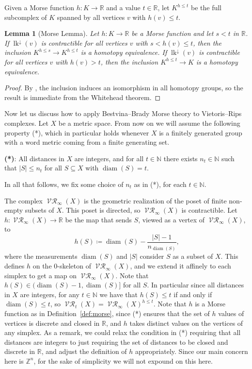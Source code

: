 \documentclass[a4paper,11pt]{amsart}
\newtheorem{lemma}[theorem]{Lemma}
\theoremstyle{definition}
\newcommand{\N}{\mathbb{N}}
\newcommand{\Z}{\mathbb{Z}}
\newcommand{\R}{\mathbb{R}}
\DeclareMathOperator{\diam}{diam}
\DeclareMathOperator{\Rips}{\mathcal{VR}}
\newcommand{\lk}{\operatorname{lk}}
\newcommand{\dlk}{\lk^\downarrow\!}
\numberwithin{equation}{section}
\begin{document}
Given a Morse function $h\colon K\to \R$ and a value $t\in\R$, let $K^{h\le t}$ be the full subcomplex of $K$ spanned by all vertices $v$ with $h(v)\le t$.

\begin{lemma}[Morse Lemma]\label{lem:morse}
Let $h\colon K\to\R$ be a Morse function and let $s<t$ in $\R$. If $\dlk(v)$ is contractible for all vertices $v$ with $s<h(v)\le t$, then the inclusion $K^{h\le s}\to K^{h\le t}$ is a homotopy equivalence. If $\dlk(v)$ is contractible for all vertices $v$ with $h(v)>t$, then the inclusion $K^{h\le t}\to K$ is a homotopy equivalence.
\end{lemma}

\begin{proof}
By \cite[Corollary~1.11]{zaremsky22}, the inclusion induces an isomorphism in all homotopy groups, so the result is immediate from the Whitehead theorem.
\end{proof}

\medskip

Now let us discuss how to apply Bestvina--Brady Morse theory to Vietoris--Rips complexes. Let $X$ be a metric space. From now on we will assume the following property (*), which in particular holds whenever $X$ is a finitely generated group with a word metric coming from a finite generating set.

\medskip

\noindent\textbf{(*)}: All distances in $X$ are integers, and for all $t\in\N$ there exists $n_t\in\N$ such that $|S|\le n_t$ for all $S\subseteq X$ with $\diam(S)=t$.

\medskip

In all that follows, we fix some choice of $n_t$ as in (*), for each $t\in\N$.

The complex $\Rips_\infty(X)$ is the geometric realization of the poset of finite non-empty subsets of $X$. This poset is directed, so $\Rips_\infty(X)$ is contractible. Let $h\colon \Rips_\infty(X) \to \R$ be the map that sends $S$, viewed as a vertex of $\Rips_\infty(X)$, to
\[
h(S)\coloneqq \diam(S) - \frac{|S|-1}{n_{\diam(S)}}\text{,}
\]
where the measurements $\diam(S)$ and $|S|$ consider $S$ as a subset of $X$. This defines $h$ on the 0-skeleton of $\Rips_\infty(X)$, and we extend it affinely to each simplex to get a map on $\Rips_\infty(X)$. Note that $h(S)\in (\diam(S)-1,\diam(S)]$ for all $S$. In particular since all distances in $X$ are integers, for any $t\in\N$ we have that $h(S)\le t$ if and only if $\diam(S)\le t$, so $\Rips_t(X)=\Rips_\infty(X)^{h\le t}$. Note that $h$ is a Morse function as in Definition~\ref{def:morse}, since (*) ensures that the set of $h$ values of vertices is discrete and closed in $\R$, and $h$ takes distinct values on the vertices of any simplex. As a remark, we could relax the condition in (*) requiring that all distances are integers to just requiring the set of distances to be closed and discrete in $\R$, and adjust the definition of $h$ appropriately. Since our main concern here is $\Z^n$, for the sake of simplicity we will not expound on this here.
\end{document}
